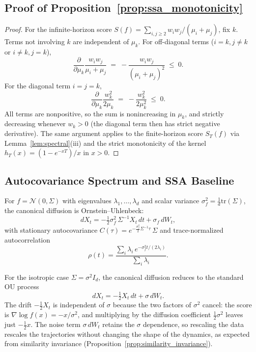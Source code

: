 \documentclass{article}
\newcommand{\tr}{\mathrm{tr}}
\begin{document}
\subsection{Proof of Proposition~\ref{prop:ssa_monotonicity}}
\label{app:monotonicity_proof}
\begin{proof}
For the infinite-horizon score $S(f) = \sum_{i, j \geq 2} w_i w_j / (\mu_i + \mu_j)$, fix $k$. Terms not involving $k$ are independent of $\mu_k$. For off-diagonal terms ($i = k, j \neq k$ or $i \neq k, j = k$),
\[
\frac{\partial}{\partial \mu_k} \frac{w_i w_j}{\mu_i + \mu_j} \;=\; -\frac{w_i w_j}{(\mu_i + \mu_j)^2} \;\leq\; 0.
\]
For the diagonal term $i = j = k$,
\[
\frac{\partial}{\partial \mu_k} \frac{w_k^2}{2\mu_k} \;=\; -\frac{w_k^2}{2\mu_k^2} \;\leq\; 0.
\]
All terms are nonpositive, so the sum is nonincreasing in $\mu_k$, and strictly decreasing whenever $w_k > 0$ (the diagonal term then has strict negative derivative). The same argument applies to the finite-horizon score $S_T(f)$ via Lemma~\ref{lem:spectral}(iii) and the strict monotonicity of the kernel $h_T(x) = (1 - e^{-xT})/x$ in $x > 0$.
\end{proof}

\subsection{Autocovariance Spectrum and SSA Baseline}
\label{app:ou_autocovariance}

For $f = \mathcal{N}(0,\Sigma)$ with eigenvalues $\lambda_1,\ldots,\lambda_d$ and scalar variance $\sigma_f^2 = \frac{1}{d}\tr(\Sigma)$, the canonical diffusion is Ornstein--Uhlenbeck:
\[
dX_t = -\tfrac{1}{2}\sigma_f^2\,\Sigma^{-1} X_t\,dt + \sigma_f\,dW_t,
\]
with stationary autocovariance $C(\tau) = e^{-\frac{\sigma_f^2}{2}\Sigma^{-1}\tau}\,\Sigma$ and trace-normalized autocorrelation
\[
\rho(t) = \frac{\sum_i \lambda_i\, e^{-\sigma_f^2 t/(2\lambda_i)}}{\sum_i \lambda_i}.
\]

For the isotropic case $\Sigma = \sigma^2 I_d$, the canonical diffusion
reduces to the standard OU process
\[
dX_t = -\tfrac{1}{2} X_t\,dt + \sigma\,dW_t.
\]
The drift $-\tfrac{1}{2} X_t$ is independent of $\sigma$ because the two
factors of $\sigma^2$ cancel: the score is $\nabla \log f(x) = -x/\sigma^2$,
and multiplying by the diffusion coefficient $\tfrac{1}{2}\sigma^2$ leaves
just $-\tfrac{1}{2} x$. The noise term $\sigma\,dW_t$ retains the $\sigma$
dependence, so rescaling the data rescales the trajectories without
changing the shape of the dynamics, as expected from similarity invariance
(Proposition~\ref{prop:similarity_invariance}).
\end{document}
